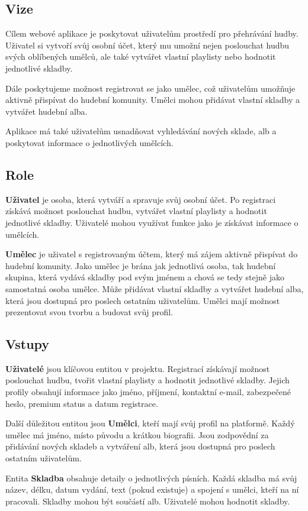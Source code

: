 \subsection*{Vize}
Cílem webové aplikace je poskytovat uživatelům prostředí pro přehrávání hudby.
Uživatel si vytvoří svůj osobní účet, který mu umožní nejen poslouchat
hudbu svých oblíbených umělců, ale také vytvářet
vlastní playlisty nebo hodnotit jednotlivé skladby.

Dále poskytujeme možnost registrovat se jako umělec,
což uživatelům umožňuje aktivně přispívat do hudební komunity.
Umělci mohou přidávat vlastní skladby a vytvářet hudební alba.

Aplikace má také uživatelům usnadňovat vyhledávání nových sklade, alb
a poskytovat informace o jednotlivých umělcích.


\subsection*{Role}
\textbf{Uživatel} je osoba, která vytváří a spravuje svůj osobní účet.
Po registraci získává možnost poslouchat hudbu, vytvářet vlastní playlisty
a hodnotit jednotlivé skladby.
Uživatelé mohou využívat funkce jako je získávat informace o umělcích.


\textbf{Umělec} je uživatel s registrovaným účtem, který má zájem aktivně přispívat do hudební komunity.
Jako umělec je brána jak jednotlivá osoba, tak hudební skupina, která vydává skladby pod svým jménem a chová
se tedy stejně jako samostatná osoba umělce.
Může přidávat vlastní skladby a vytvářet hudební alba, která jsou dostupná pro poslech ostatním uživatelům.
Umělci mají možnost prezentovat svou tvorbu a budovat svůj profil.

\subsection*{Vstupy}
\textbf{Uživatelé} jsou klíčovou entitou v projektu.
Registrací získávají možnost poslouchat hudbu, tvořit vlastní playlisty a hodnotit jednotlivé skladby.
Jejich profily obsahují informace jako jméno, příjmení, kontaktní e-mail, zabezpečené heslo, premium status a datum registrace.


Další důležitou entitou jsou \textbf{Umělci}, kteří mají svůj profil na platformě.
Každý umělec má jméno, místo původu a krátkou biografii.
Jsou zodpovědní za přidávání nových skladeb a vytváření alb, která jsou dostupná pro poslech ostatním uživatelům.


Entita \textbf{Skladba} obsahuje detaily o jednotlivých písních.
Každá skladba má svůj název, délku, datum vydání, text (pokud existuje) a spojení s umělci, kteří na ní pracovali.
Skladby mohou být součástí alb.
Uživatelé mohou hodnotit skladby.


